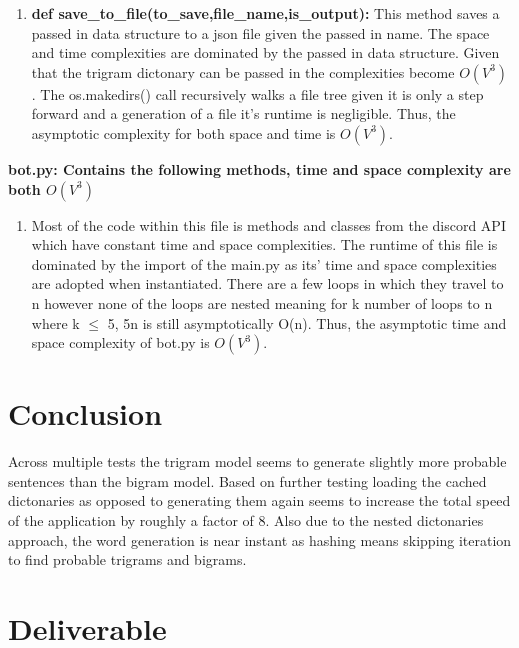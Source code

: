 \documentclass[10pt,titlepage]{article}
\begin{document}
\begin{enumerate}
		\item \textbf{def save\_to\_file(to\_save,file\_name,is\_output):} 
		\subitem This method saves a passed in data structure to a json file given the passed in name.
		\subitem The space and time complexities are dominated by the passed in data structure. Given that the trigram dictonary can be passed in the complexities become $O(V^3)$.
		\subitem The os.makedirs() call recursively walks a file tree given it is only a step forward and a generation of a file it's runtime is negligible.
		\subitem Thus, the asymptotic complexity for both space and time is $O(V^3)$.
		
	\end{enumerate}
	
	\textbf{bot.py: Contains the following methods, time and space complexity are both $O(V^3)$}
	
	\begin{enumerate}
		\item Most of the code within this file is methods and classes from the discord API which have constant time and space complexities. The runtime of this file is dominated by the import of the main.py as its' time and space complexities are adopted when instantiated. There are a few loops in which they travel to n however none of the loops are nested meaning for k number of loops to n where k $\leq$ 5, 5n is still asymptotically O(n). Thus, the asymptotic time and space complexity of bot.py is $O(V^3)$.
	\end{enumerate}
	
		\clearpage
	\section*{Conclusion}
	
	\begin{spverbatim}
		Across multiple tests the trigram model seems to generate slightly more probable sentences than the bigram model. Based on further testing loading the cached dictonaries as opposed to generating them again seems to increase the total speed of the application by roughly a factor of 8. Also due to the nested dictonaries approach, the word generation is near instant as hashing means skipping iteration to find probable trigrams and bigrams.
	\end{spverbatim}
	
	
	\section*{Deliverable}
\end{document}
